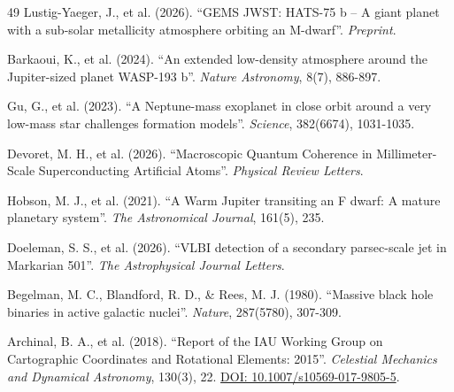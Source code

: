 \documentclass[11pt, a4paper]{article}
\newcommand{\doi}[1]{\href{https://doi.org/#1}{DOI: #1}}
\begin{document}
\begin{thebibliography}{49}
  Lustig-Yaeger, J., et al. (2026). ``GEMS JWST: HATS-75 b -- A giant planet with a sub-solar metallicity atmosphere orbiting an M-dwarf''. \textit{Preprint}.

  Barkaoui, K., et al. (2024). ``An extended low-density atmosphere around the Jupiter-sized planet WASP-193 b''. \textit{Nature Astronomy}, 8(7), 886-897.

  Gu, G., et al. (2023). ``A Neptune-mass exoplanet in close orbit around a very low-mass star challenges formation models''. \textit{Science}, 382(6674), 1031-1035.

  Devoret, M. H., et al. (2026). ``Macroscopic Quantum Coherence in Millimeter-Scale Superconducting Artificial Atoms''. \textit{Physical Review Letters}.

  Hobson, M. J., et al. (2021). ``A Warm Jupiter transiting an F dwarf: A mature planetary system''. \textit{The Astronomical Journal}, 161(5), 235.

  Doeleman, S. S., et al. (2026). ``VLBI detection of a secondary parsec-scale jet in Markarian 501''. \textit{The Astrophysical Journal Letters}.

  Begelman, M. C., Blandford, R. D., \& Rees, M. J. (1980). ``Massive black hole binaries in active galactic nuclei''. \textit{Nature}, 287(5780), 307-309.

  Archinal, B. A., et al. (2018). ``Report of the IAU Working Group on Cartographic Coordinates and Rotational Elements: 2015''. \textit{Celestial Mechanics and Dynamical Astronomy}, 130(3), 22. 
  \doi{10.1007/s10569-017-9805-5}.

\end{thebibliography}
\end{document}
